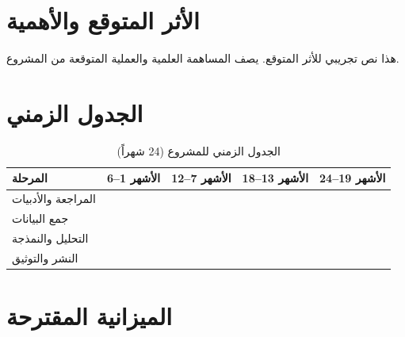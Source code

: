 \documentclass[11pt,a4paper]{article}
\begin{document}
\section{الأثر المتوقع والأهمية}
\label{sec:impact}

هذا نص تجريبي للأثر المتوقع. يصف المساهمة العلمية والعملية المتوقعة من المشروع.

\section{الجدول الزمني}
\label{sec:timeline}


\begin{table}[H]
\centering
\caption{الجدول الزمني للمشروع (24 شهراً)}
\small
{}
\begin{tabular}{|l|c|c|c|c|}
\hline
\textbf{المرحلة} & \textbf{الأشهر 1--6} & \textbf{الأشهر 7--12} & \textbf{الأشهر 13--18} & \textbf{الأشهر 19--24} \\
\hline
المراجعة والأدبيات & \cellcolor{ganttbar} & & & \\
\hline
جمع البيانات & & \cellcolor{ganttbar} & & \\
\hline
التحليل والنمذجة & & & \cellcolor{ganttbar} & \\
\hline
النشر والتوثيق & & & & \cellcolor{ganttbar} \\
\hline
\end{tabular}
\end{table}

\section{الميزانية المقترحة}
\label{sbudget}

\end{document}

